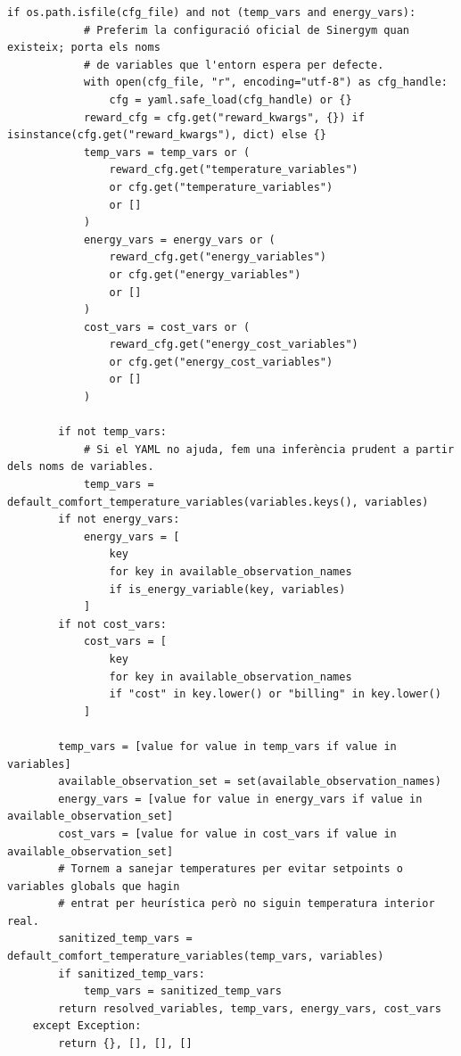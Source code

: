 \documentclass[10pt,a4paper]{article}
\begin{document}
\begin{lstlisting}[style=studioPython,caption={backend/entrenar\_agent\_env.py},label={lst:backend-entrenar-agent-env-py}]
        if os.path.isfile(cfg_file) and not (temp_vars and energy_vars):
            # Preferim la configuració oficial de Sinergym quan existeix; porta els noms
            # de variables que l'entorn espera per defecte.
            with open(cfg_file, "r", encoding="utf-8") as cfg_handle:
                cfg = yaml.safe_load(cfg_handle) or {}
            reward_cfg = cfg.get("reward_kwargs", {}) if isinstance(cfg.get("reward_kwargs"), dict) else {}
            temp_vars = temp_vars or (
                reward_cfg.get("temperature_variables")
                or cfg.get("temperature_variables")
                or []
            )
            energy_vars = energy_vars or (
                reward_cfg.get("energy_variables")
                or cfg.get("energy_variables")
                or []
            )
            cost_vars = cost_vars or (
                reward_cfg.get("energy_cost_variables")
                or cfg.get("energy_cost_variables")
                or []
            )

        if not temp_vars:
            # Si el YAML no ajuda, fem una inferència prudent a partir dels noms de variables.
            temp_vars = default_comfort_temperature_variables(variables.keys(), variables)
        if not energy_vars:
            energy_vars = [
                key
                for key in available_observation_names
                if is_energy_variable(key, variables)
            ]
        if not cost_vars:
            cost_vars = [
                key
                for key in available_observation_names
                if "cost" in key.lower() or "billing" in key.lower()
            ]

        temp_vars = [value for value in temp_vars if value in variables]
        available_observation_set = set(available_observation_names)
        energy_vars = [value for value in energy_vars if value in available_observation_set]
        cost_vars = [value for value in cost_vars if value in available_observation_set]
        # Tornem a sanejar temperatures per evitar setpoints o variables globals que hagin
        # entrat per heurística però no siguin temperatura interior real.
        sanitized_temp_vars = default_comfort_temperature_variables(temp_vars, variables)
        if sanitized_temp_vars:
            temp_vars = sanitized_temp_vars
        return resolved_variables, temp_vars, energy_vars, cost_vars
    except Exception:
        return {}, [], [], []
\end{lstlisting}

\end{document}
